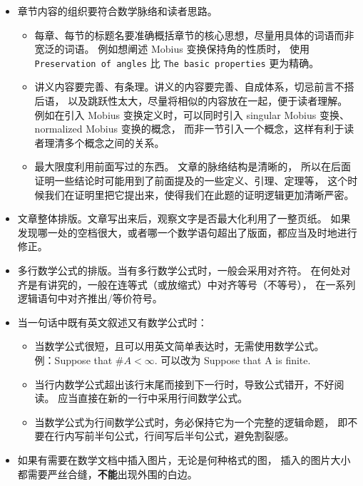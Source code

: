 \begin{itemize}
\begin{itemize}
  	\item 章节内容的组织要符合数学脉络和读者思路。
  	\begin{itemize}
  		\item 每章、每节的标题名要准确概括章节的核心思想，尽量用具体的词语而非宽泛的词语。
  		例如想阐述 Mobius 变换保持角的性质时，
  		使用 \lstinline|Preservation of angles| 比 \lstinline|The basic properties| 
  		更为精确。
  		\item 讲义内容要完善、有条理。讲义的内容要完善、自成体系，切忌前言不搭后语，
  		以及跳跃性太大，尽量将相似的内容放在一起，便于读者理解。
  		例如在引入 Mobius 变换定义时，可以同时引入 singular Mobius 变换、 
  		normalized Mobius 变换的概念，
  		而非一节引入一个概念，这样有利于读者理清多个概念之间的关系。
  		\item 最大限度利用前面写过的东西。
  		文章的脉络结构是清晰的，
  		所以在后面证明一些结论时可能用到了前面提及的一些定义、引理、定理等，
  		这个时候我们在证明里把它提出来，使得我们在此题的证明逻辑更加清晰严密。
  	\end{itemize}
  	\item 文章整体排版。文章写出来后，观察文字是否最大化利用了一整页纸。
  	如果发现哪一处的空档很大，或者哪一个数学语句超出了版面，都应当及时地进行修正。
  	\item 多行数学公式的排版。当有多行数学公式时，一般会采用对齐符。
  	在何处对齐是有讲究的，一般在连等式（或放缩式）中对齐等号（不等号），
  	在一系列逻辑语句中对齐推出/等价符号。
  	\item 当一句话中既有英文叙述又有数学公式时：
  	\begin{itemize}
  		\item 当数学公式很短，且可以用英文简单表达时，无需使用数学公式。\\
  		例：Suppose that $\#A<\infty$. 可以改为 Suppose that A is finite. 
  		\item 当行内数学公式超出该行末尾而接到下一行时，导致公式错开，不好阅读。
  		应当直接在新的一行中采用行间数学公式。
  		\item 当数学公式为行间数学公式时，务必保持它为一个完整的逻辑命题，
  		即不要在行内写前半句公式，行间写后半句公式，避免割裂感。
  	\end{itemize}
    \item 如果有需要在数学文档中插入图片，无论是何种格式的图，
    插入的图片大小都需要严丝合缝，\textbf{不能}出现外围的白边。
  \end{itemize}
\end{itemize}

